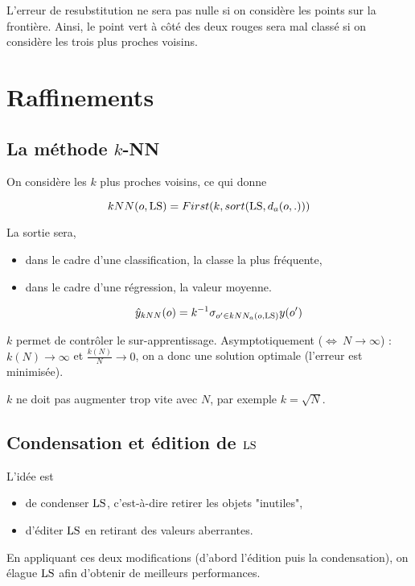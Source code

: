 	L'erreur de resubstitution ne sera pas nulle si on considère les points sur la frontière. Ainsi, le point vert à côté des deux rouges sera mal classé si on considère les trois plus proches voisins.
	
	\section{Raffinements}
	
		\subsection{La méthode $k$-NN}
		
		On considère les $k$ plus proches voisins, ce qui donne
		
		$$kNN(o, \text{LS}) = First(k, sort(\text{LS}, d_a(o, .)))$$
		
		La sortie sera,
		
		\begin{itemize}
			\item dans le cadre d'une classification, la classe la plus fréquente,
			\item dans le cadre d'une régression, la valeur moyenne.
			
			$$\hat{y}_{kNN}(o) = k^{-1} \sigma_{o' \in kNN_a(o, \text{LS})} y(o')$$
		\end{itemize}
		
		$k$ permet de contrôler le sur-apprentissage. Asymptotiquement ($\Leftrightarrow \: N \rightarrow \infty$) : $k(N) \rightarrow \infty$ et $\frac{k(N)}{N} \rightarrow 0$, on a donc une solution optimale (l'erreur est minimisée).
		
		
		$k$ ne doit pas augmenter trop vite avec $N$, par exemple $k = \sqrt{N}$.
		
		\subsection{Condensation et édition de $\text{LS}$}
		
		L'idée est
		
		\begin{itemize}
			\item de condenser $\text{LS}$, c'est-à-dire retirer les objets "inutiles",
			\item d'éditer $\text{LS}$ en retirant des valeurs aberrantes.
		\end{itemize}
		
		En appliquant ces deux modifications (d'abord l'édition puis la condensation), on élague $\text{LS}$ afin d'obtenir de meilleurs performances.
		
